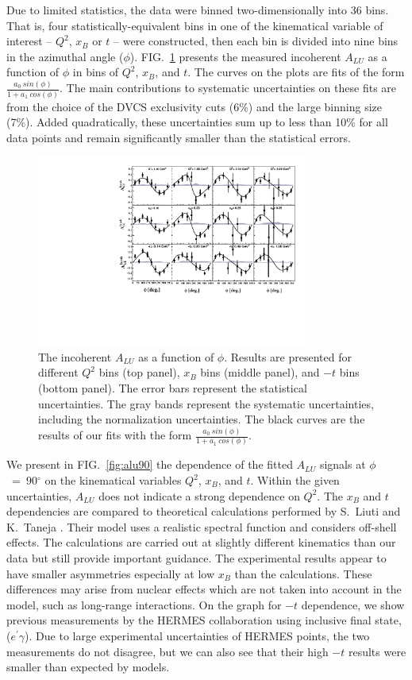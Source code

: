 \documentclass[twocolumn,nofootinbib,showpacs,prl,superscriptaddress,secnumarabic,amssymb,nobibnotes,aps,floatfix]{revtex4}
\begin{document}
Due to limited statistics, the data were binned two-dimensionally into 36 bins.  
That is, four statistically-equivalent bins in one of the kinematical 
variable of interest -- $Q^{2}$, $x_{B}$ or $t$ -- were constructed, then each 
bin is divided into nine bins in the azimuthal angle ($\phi$).  
FIG.~\ref{fig:alu} presents the measured incoherent $A_{LU}$ as a function of 
$\phi$ in bins of $Q^{2}$, $x_{B}$, and $t$. The curves on the plots are fits 
of the form $\frac{a_{0}~sin(\phi)}{1+ a_{1}~cos(\phi)}$. The main contributions 
to systematic uncertainties on these fits are from the choice of the DVCS 
exclusivity cuts (6\%) and the large binning size (7\%). Added quadratically, 
these uncertainties sum up to less than 10\% for all data points and remain 
significantly smaller than the statistical errors.

\begin{figure}[tb]
\includegraphics[width=8.9cm]{figs/incoherent_ALU_phi.pdf}
\caption{The incoherent $A_{LU}$ as a function of $\phi$. Results are presented
   for different $Q^{2}$ bins (top panel), $x_{B}$ bins (middle panel), and 
   $-t$ bins (bottom panel). The error bars represent the statistical 
   uncertainties. The gray bands represent the systematic uncertainties, 
   including the normalization uncertainties. The black curves are the results 
   of our fits with the form $\frac{a_{0}~sin(\phi)}{1+ a_{1}~cos(\phi)}$.}
\label{fig:alu}
\end{figure}


We present in FIG.~\ref{fig:alu90} the dependence of the fitted $A_{LU}$ 
signals at $\phi$~=~90$^{\circ}$ on the kinematical variables $Q^2$, $x_{B}$, 
and $t$. Within the given uncertainties, $A_{LU}$ does not indicate a strong 
dependence on $Q^2$. The $x_{B}$ and $t$ dependencies are compared to 
theoretical calculations performed by S.~Liuti and K.~Taneja 
\cite{simonetta_2}. Their model uses a realistic spectral function and 
considers off-shell effects. The calculations are carried out at slightly 
different kinematics than our data but still provide important guidance. The 
experimental results appear to have smaller asymmetries especially at low 
$x_{B}$ than the calculations.  These differences may arise from nuclear 
effects which are not taken into account in the model, such as long-range 
interactions.  On the graph for $-t$ dependence, we show previous measurements 
by the HERMES collaboration \cite{Airapetian:2009cga} using inclusive final 
state, ($e^\prime\gamma$). Due to large experimental uncertainties of HERMES 
points, the two measurements do not disagree, but we can also see that their 
high $-t$ results were smaller than expected by models. 
\end{document}
